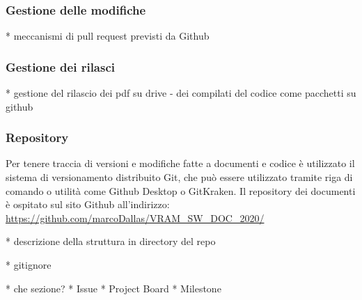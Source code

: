 	\subsubsection{Gestione delle modifiche}
		* meccanismi di pull request previsti da Github
	
	\subsubsection{Gestione dei rilasci}
		* gestione del rilascio dei pdf su drive - dei compilati del codice come pacchetti su github
	
	\subsubsection{Repository}
		Per tenere traccia di versioni e modifiche fatte a documenti e codice è utilizzato il sistema di versionamento distribuito Git, che può essere utilizzato tramite riga di comando o utilità come Github Desktop o GitKraken.
		Il repository dei documenti è ospitato sul sito Github all'indirizzo: \url{https://github.com/marcoDallas/VRAM_SW_DOC_2020/}

		* descrizione della struttura in directory del repo
		
		* gitignore
		
		* che sezione?
		* Issue
		* Project Board
		* Milestone
		